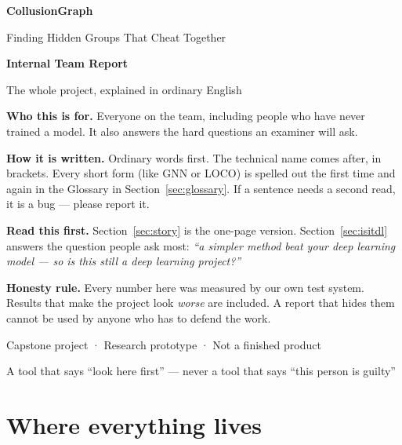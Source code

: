 \documentclass[11pt,a4paper]{article}
\begin{document}
\begin{titlepage}
\centering
\vspace*{2.5cm}
{\Huge\bfseries CollusionGraph\par}
\vspace{0.6cm}
{\LARGE Finding Hidden Groups That Cheat Together\par}
\vspace{1.4cm}
{\Large\bfseries Internal Team Report\par}
\vspace{0.4cm}
{\large The whole project, explained in ordinary English\par}
\vspace{2.2cm}

\begin{plain}
\raggedright
\textbf{Who this is for.} Everyone on the team, including people who have never
trained a model. It also answers the hard questions an examiner will ask.

\vspace{4pt}
\textbf{How it is written.} Ordinary words first. The technical name comes after,
in brackets. Every short form (like GNN or LOCO) is spelled out the first time
and again in the Glossary in Section~\ref{sec:glossary}. If a sentence needs a
second read, it is a bug --- please report it.

\vspace{4pt}
\textbf{Read this first.} Section~\ref{sec:story} is the one-page version.
Section~\ref{sec:isitdl} answers the question people ask most:
\emph{``a simpler method beat your deep learning model --- so is this still a
deep learning project?''}

\vspace{4pt}
\textbf{Honesty rule.} Every number here was measured by our own test system.
Results that make the project look \emph{worse} are included. A report that
hides them cannot be used by anyone who has to defend the work.
\end{plain}

\vfill
{\small Capstone project · Research prototype · Not a finished product\par}
{\small A tool that says ``look here first'' --- never a tool that says ``this
person is guilty''\par}
\end{titlepage}

\tableofcontents
\newpage

\section*{Where everything lives}
\end{document}
